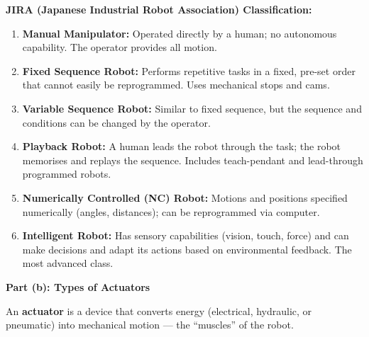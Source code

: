 \documentclass[12pt,a3paper]{article}
\begin{document}
\begin{enumerate}
\begin{tcolorbox}[enhanced,breakable,ansbox,colback=cA!4,colframe=cA,
  boxrule=0.8pt,arc=5pt,
  title={\textbf{Answer}},fonttitle=\bfseries\color{white},colbacktitle=cA]
\textbf{JIRA (Japanese Industrial Robot Association) Classification:}

\begin{enumerate}[leftmargin=*,itemsep=3pt,label=\textbf{Class \arabic*:}]
  \item \textbf{Manual Manipulator:} Operated directly by a human; no
        autonomous capability. The operator provides all motion.
  \item \textbf{Fixed Sequence Robot:} Performs repetitive tasks in a fixed,
        pre-set order that cannot easily be reprogrammed. Uses mechanical
        stops and cams.
  \item \textbf{Variable Sequence Robot:} Similar to fixed sequence, but the
        sequence and conditions can be changed by the operator.
  \item \textbf{Playback Robot:} A human leads the robot through the task;
        the robot memorises and replays the sequence. Includes teach-pendant
        and lead-through programmed robots.
  \item \textbf{Numerically Controlled (NC) Robot:} Motions and positions
        specified numerically (angles, distances); can be reprogrammed via
        computer.
  \item \textbf{Intelligent Robot:} Has sensory capabilities (vision, touch,
        force) and can make decisions and adapt its actions based on
        environmental feedback. The most advanced class.
\end{enumerate}

\hrulefill

\textbf{Part (b): Types of Actuators}

An \textbf{actuator} is a device that converts energy (electrical, hydraulic,
or pneumatic) into mechanical motion — the ``muscles'' of the robot.

\begin{center}
\end{center}
\end{tcolorbox}
\end{enumerate}
\end{document}
